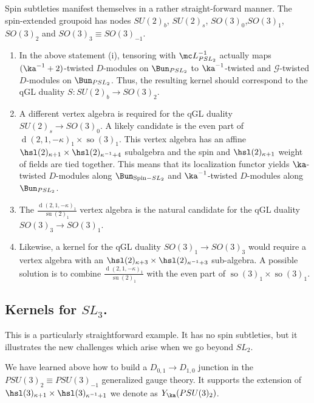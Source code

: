 \documentclass[11pt,reqno]{amsart}
\theoremstyle{plain}
\numberwithin{equation}{section}
\DeclareMathOperator{\td}{d}
\DeclareMathOperator{\tsu}{su}
\DeclareMathOperator{\tso}{so}
\theoremstyle{definition}
\begin{document}
Spin subtleties manifest themselves in a rather straight-forward
manner. The spin-extended groupoid has nodes $SU(2)_b$, $SU(2)_s$, $SO(3)_0$,$SO(3)_1$,$SO(3)_2$ and
$SO(3)_3\equiv SO(3)_{-1}$.
\begin{enumerate}
\item In the above statement (i), tensoring with ${\mc
    L}^{-1}_{PSL_2}$ actually maps $(\ka^{-1}+2)$-twisted $D$-modules
  on $\Bun_{PSL_2}$ to $\ka^{-1}$-twisted and ${\mathcal G}$-twisted
  $D$-modules on $\Bun_{PSL_2}$. Thus, the resulting kernel should
  correspond to the qGL duality $S: SU(2)_b \to SO(3)_2$.

\item A different vertex algebra is required for the qGL duality
  $SU(2)_s \to SO(3)_0$. A likely candidate is the even part of
  $\td(2,1,-\kappa)_1 \times \tso(3)_1$. This vertex algebra has an
  affine $\hsl(2)_{\kappa+1} \times \hsl(2)_{\kappa^{-1}+4}$ subalgebra
  and the spin and $\hsl(2)_{\kappa+1}$ weight of fields are tied
  together. This means that its localization functor yields
  $\ka$-twisted $D$-modules along $\Bun_{\mathrm{Spin}-SL_2}$ and
  $\ka^{-1}$-twisted $D$-modules along $\Bun_{PSL_2}$.

\item The $\frac{\td(2,1,-\kappa)_1}{\tsu(2)_1}$ vertex algebra is the natural candidate
  for the qGL duality $SO(3)_3 \to SO(3)_1$.

\item Likewise, a kernel for the qGL duality $SO(3)_1 \to SO(3)_3$
  would require a vertex algebra with an $\hsl(2)_{\kappa+3} \times
  \hsl(2)_{\kappa^{-1}+3}$ sub-algebra. A possible solution is to
  combine $\frac{\td(2,1,-\kappa)_1}{\tsu(2)_1}$ with the even part of
  $\tso(3)_1 \times \tso(3)_1$.

\end{enumerate}

\subsection{Kernels for $SL_3$.}

This is a particularly straightforward example. It has no spin subtleties, but it illustrates 
the new challenges which arise when we go beyond $SL_2$. 

We have learned above how to build a $D_{0,1} \to D_{1,0}$ junction in 
the $PSU(3)_2 \equiv PSU(3)_{-1}$ generalized gauge theory. It supports the extension of 
$\hsl(3)_{\kappa+1} \times \hsl(3)_{\kappa^{-1}+1}$ we denote as $Y_\ka(PSU(3)_2)$. 
\end{document}
